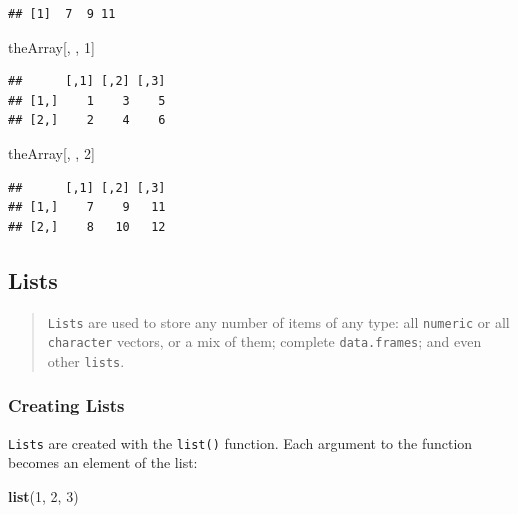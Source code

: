 \documentclass[]{book}
\newenvironment{Shaded}{\begin{snugshade}}{\end{snugshade}}
\newcommand{\DecValTok}[1]{\textcolor[rgb]{0.00,0.00,0.81}{#1}}
\newcommand{\KeywordTok}[1]{\textcolor[rgb]{0.13,0.29,0.53}{\textbf{#1}}}
\newcommand{\NormalTok}[1]{#1}
\theoremstyle{definition}
\theoremstyle{definition}
\theoremstyle{definition}
\theoremstyle{remark}
\begin{document}
\begin{verbatim}
## [1]  7  9 11
\end{verbatim}

\begin{Shaded}
\begin{Highlighting}[]
\NormalTok{theArray[, , }\DecValTok{1}\NormalTok{]}
\end{Highlighting}
\end{Shaded}

\begin{verbatim}
##      [,1] [,2] [,3]
## [1,]    1    3    5
## [2,]    2    4    6
\end{verbatim}

\begin{Shaded}
\begin{Highlighting}[]
\NormalTok{theArray[, , }\DecValTok{2}\NormalTok{]}
\end{Highlighting}
\end{Shaded}

\begin{verbatim}
##      [,1] [,2] [,3]
## [1,]    7    9   11
## [2,]    8   10   12
\end{verbatim}

\hypertarget{lists}{%
\subsection{Lists}\label{lists}}

\begin{quote}
\texttt{Lists} are used to store any number of items of any type: all
\texttt{numeric} or all \texttt{character} vectors, or a mix of them;
complete \texttt{data.frames}; and even other \texttt{lists}.
\end{quote}

\hypertarget{creating-lists}{%
\subsubsection{Creating Lists}\label{creating-lists}}

\texttt{Lists} are created with the \texttt{list()} function. Each
argument to the function becomes an element of the list:

\begin{Shaded}
\begin{Highlighting}[]
\KeywordTok{list}\NormalTok{(}\DecValTok{1}\NormalTok{, }\DecValTok{2}\NormalTok{, }\DecValTok{3}\NormalTok{)}
\end{Highlighting}
\end{Shaded}
\end{document}
